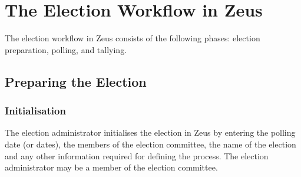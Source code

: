 \documentclass[letterpaper,twocolumn,10pt]{article}
\begin{document}





\section{The Election Workflow in Zeus}

The election workflow in Zeus consists of the following phases:
election preparation, polling, and tallying.

\subsection{Preparing the Election}

\subsubsection{Initialisation}

The election administrator initialises the election in Zeus by
entering the polling date (or dates), the members of the election
committee, the name of the election and any other information required
for defining the process. The election administrator may be a member
of the election committee.
\end{document}
